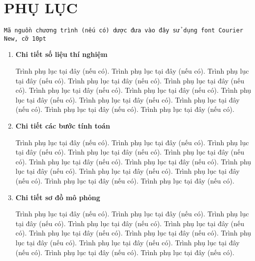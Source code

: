 \section*{\centering PHỤ LỤC}
\texttt{\fontsize{10pt}{0pt}\selectfont Mã nguồn chương trình (nếu có) dược đưa vào đây sử dụng font Courier New, cỡ 10pt}

\begin{enumerate}[label=\textbf{A\arabic*.}]
  
    \item  \textbf{Chi tiết số liệu thí nghiệm}
    
    Trình phụ lục tại đây (nếu có). Trình phụ lục tại đây (nếu có). Trình phụ lục tại đây (nếu có). Trình phụ lục tại đây (nếu có). Trình phụ lục tại đây (nếu có). Trình phụ lục tại đây (nếu có). Trình phụ lục tại đây (nếu có). Trình phụ lục tại đây (nếu có). Trình phụ lục tại đây (nếu có). Trình phụ lục tại đây (nếu có). Trình phụ lục tại đây (nếu có). Trình phụ lục tại đây (nếu có).
    \item  \textbf{Chi tiết các bước tính toán}
    
    Trình phụ lục tại đây (nếu có). Trình phụ lục tại đây (nếu có). Trình phụ lục tại đây (nếu có). Trình phụ lục tại đây (nếu có). Trình phụ lục tại đây (nếu có). Trình phụ lục tại đây (nếu có). Trình phụ lục tại đây (nếu có). Trình phụ lục tại đây (nếu có). Trình phụ lục tại đây (nếu có). Trình phụ lục tại đây (nếu có). Trình phụ lục tại đây (nếu có). Trình phụ lục tại đây (nếu có).
    \item  \textbf{Chi tiết sơ đồ mô phỏng}
    
    Trình phụ lục tại đây (nếu có). Trình phụ lục tại đây (nếu có). Trình phụ lục tại đây (nếu có). Trình phụ lục tại đây (nếu có). Trình phụ lục tại đây (nếu có). Trình phụ lục tại đây (nếu có). Trình phụ lục tại đây (nếu có). Trình phụ lục tại đây (nếu có). Trình phụ lục tại đây (nếu có). Trình phụ lục tại đây (nếu có). Trình phụ lục tại đây (nếu có). Trình phụ lục tại đây (nếu có).
    
\end{enumerate}